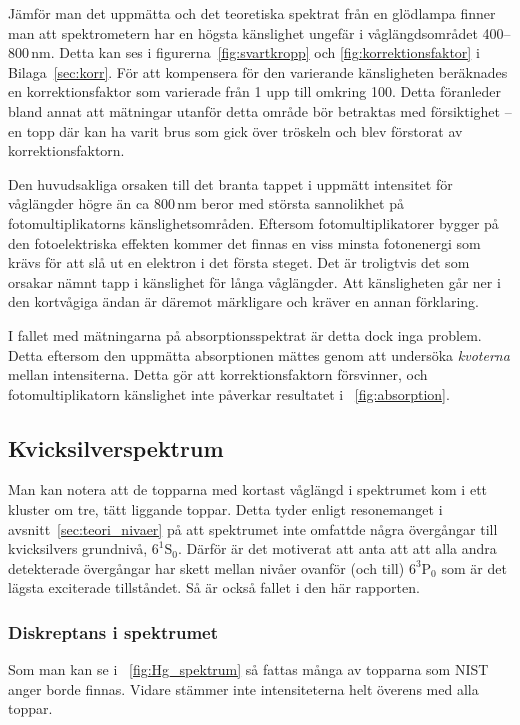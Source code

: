 \documentclass[11pt,a4paper]{article}
\newcommand{\figref}{\figurename~\ref}
\begin{document}
Jämför man det uppmätta och det teoretiska spektrat
från en glödlampa finner man att spektrometern har en högsta
känslighet ungefär i våglängdsområdet 400--800\,nm. Detta kan ses i
figurerna~\ref{fig:svartkropp} och \ref{fig:korrektionsfaktor} i
Bilaga~\ref{sec:korr}. För att kompensera för den varierande
känsligheten beräknades en korrektionsfaktor som varierade från 1 upp
till omkring 100.
Detta föranleder bland annat att mätningar
utanför detta område bör betraktas med försiktighet -- en topp där kan
ha varit brus som gick över tröskeln och blev förstorat av
korrektionsfaktorn. 

Den huvudsakliga orsaken till det branta tappet i uppmätt intensitet
för våglängder högre än ca 800\,nm beror med största sannolikhet på
fotomultiplikatorns känslighetsområden. Eftersom fotomultiplikatorer
bygger på den fotoelektriska effekten kommer det finnas en viss minsta
fotonenergi som krävs för att slå ut en elektron i det första
steget. Det är troligtvis det som orsakar nämnt tapp i
känslighet för långa våglängder. Att känsligheten går ner i den
kortvågiga ändan är däremot märkligare och kräver en annan
förklaring. 

I fallet med mätningarna på absorptionsspektrat är detta dock inga
problem. Detta eftersom den uppmätta absorptionen mättes genom att
undersöka \emph{kvoterna} mellan intensiterna. Detta gör att
korrektionsfaktorn försvinner, och fotomultiplikatorn känslighet inte
påverkar resultatet i \figref{fig:absorption}.


\subsection{Kvicksilverspektrum}
Man kan notera att de topparna med kortast våglängd i spektrumet kom i
ett kluster om tre, tätt liggande toppar. Detta tyder enligt
resonemanget i avsnitt~\ref{sec:teori_nivaer} på att spektrumet inte
omfattde några övergångar till kvicksilvers grundnivå,
$6^1\mathrm{S}_0$. Därför är det motiverat att anta att att alla andra
detekterade övergångar har skett mellan nivåer ovanför (och till)
$6^3\mathrm{P}_0$ som är det lägsta exciterade tillståndet. Så är
också fallet i den här rapporten.

\subsubsection{Diskreptans i spektrumet}
Som man kan se i \figref{fig:Hg_spektrum} så fattas många av topparna
som NIST \cite{NIST_spectrum} anger borde finnas. Vidare stämmer inte
intensiteterna helt överens med alla toppar. 
\end{document}
